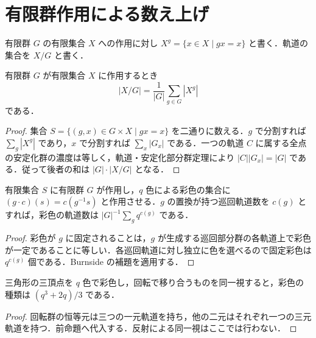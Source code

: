 \section{有限群作用による数え上げ}
\begin{defn}[元の固定点集合]
有限群 $G$ の有限集合 $X$ への作用に対し $X^g=\{x\in X\mid gx=x\}$ と書く．軌道の集合を $X/G$ と書く．
\end{defn}
\begin{prop}[Burnsideの補題]
有限群 $G$ が有限集合 $X$ に作用するとき
\[
|X/G|=\frac{1}{|G|}\sum_{g\in G}|X^g|
\]
である．
\end{prop}
\begin{proof}
集合 $S=\{(g,x)\in G\times X\mid gx=x\}$ を二通りに数える．$g$ で分割すれば $\sum_g|X^g|$ であり，$x$ で分割すれば $\sum_x|G_x|$ である．一つの軌道 $C$ に属する全点の安定化群の濃度は等しく，軌道・安定化部分群定理により $|C||G_x|=|G|$ である．従って後者の和は $|G|\cdot|X/G|$ となる．
\end{proof}
\begin{prop}[彩色の軌道数]
有限集合 $S$ に有限群 $G$ が作用し，$q$ 色による彩色の集合に $(g\cdot c)(s)=c(g^{-1}s)$ と作用させる．$g$ の置換が持つ巡回軌道数を $c(g)$ とすれば，彩色の軌道数は $|G|^{-1}\sum_g q^{c(g)}$ である．
\end{prop}
\begin{proof}
彩色が $g$ に固定されることは，$g$ が生成する巡回部分群の各軌道上で彩色が一定であることに等しい．各巡回軌道に対し独立に色を選べるので固定彩色は $q^{c(g)}$ 個である．Burnside の補題を適用する．
\end{proof}
\begin{prop}[三角形の回転と彩色]
三角形の三頂点を $q$ 色で彩色し，回転で移り合うものを同一視すると，彩色の種類は $(q^3+2q)/3$ である．
\end{prop}
\begin{proof}
回転群の恒等元は三つの一元軌道を持ち，他の二元はそれぞれ一つの三元軌道を持つ．前命題へ代入する．反射による同一視はここでは行わない．
\end{proof}
